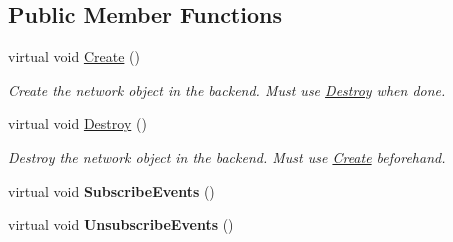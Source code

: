 \subsection*{Public Member Functions}
\begin{DoxyCompactItemize}
\item 
virtual void \hyperlink{class_skyrates_1_1_common_1_1_network_1_1_network_common_a575172eb9f965e181e19649bcce38ca0}{Create} ()
\begin{DoxyCompactList}\small\item\em Create the network object in the backend. Must use \hyperlink{class_skyrates_1_1_common_1_1_network_1_1_network_common_aa00266a16aa27dfd0eb242c74856a92a}{Destroy} when done. \end{DoxyCompactList}\item 
virtual void \hyperlink{class_skyrates_1_1_common_1_1_network_1_1_network_common_aa00266a16aa27dfd0eb242c74856a92a}{Destroy} ()
\begin{DoxyCompactList}\small\item\em Destroy the network object in the backend. Must use \hyperlink{class_skyrates_1_1_common_1_1_network_1_1_network_common_a575172eb9f965e181e19649bcce38ca0}{Create} beforehand. \end{DoxyCompactList}\item 
\hypertarget{class_skyrates_1_1_common_1_1_network_1_1_network_common_a81f23c8c699f220ba0d866721c491d9f}{virtual void {\bfseries Subscribe\-Events} ()}\label{class_skyrates_1_1_common_1_1_network_1_1_network_common_a81f23c8c699f220ba0d866721c491d9f}

\item 
\hypertarget{class_skyrates_1_1_common_1_1_network_1_1_network_common_a9e0a9edb323efcdea06a91ca37ca0887}{virtual void {\bfseries Unsubscribe\-Events} ()}\label{class_skyrates_1_1_common_1_1_network_1_1_network_common_a9e0a9edb323efcdea06a91ca37ca0887}


\end{DoxyCompactItemize}
